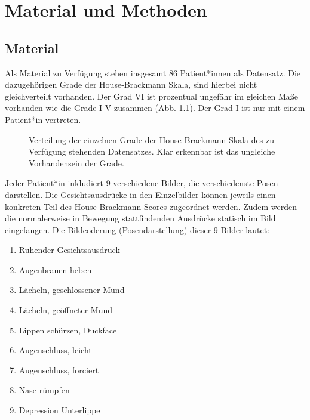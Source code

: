 
\chapter{Material und Methoden}\label{mat_and_method}


\section{Material}\label{material}
Als Material zu Verfügung stehen insgesamt 86 Patient*innen als Datensatz. Die dazugehörigen Grade der House-Brackmann Skala, sind hierbei nicht gleichverteilt vorhanden. Der Grad VI ist prozentual ungefähr im gleichen Maße vorhanden wie die Grade I-V zusammen (Abb. \ref{cap:pie_grade}). Der Grad I ist nur mit einem Patient*in vertreten.

\begin{figure}[!b]\centering
{}
\caption[Verteilung der einzelnen Grade der House-Brackmann Skala]{Verteilung der einzelnen Grade der House-Brackmann Skala des zu Verfügung stehenden Datensatzes. Klar erkennbar ist das ungleiche Vorhandensein der Grade.}\label{cap:pie_grade}
\end{figure}\label{fig:pie_grade}


 Jeder Patient*in inkludiert 9 verschiedene Bilder, die verschiedenste Posen darstellen. Die Gesichtsausdrücke in den Einzelbilder können jeweils einen konkreten Teil des House-Brackmann Scores zugeordnet werden. Zudem werden die normalerweise in Bewegung stattfindenden Ausdrücke statisch im Bild eingefangen. Die Bildcoderung (Posendarstellung) dieser 9 Bilder lautet:

\begin{enumerate}
  \setlength\itemsep{-0.6em}
\item Ruhender Gesichtsausdruck
\item Augenbrauen heben
\item Lächeln, geschlossener Mund
\item Lächeln, geöffneter Mund
\item Lippen schürzen, \glqq Duckface\grqq{}
\item Augenschluss, leicht
\item Augenschluss, forciert
\item Nase rümpfen
\item Depression Unterlippe
\end{enumerate}

